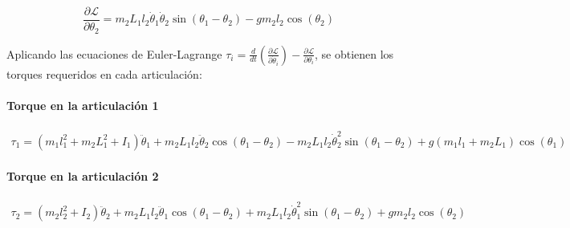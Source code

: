 \begin{equation}
\frac{\partial \mathcal{L}}{\partial \theta_2} = m_2L_1l_2\dot{\theta}_1\dot{\theta}_2\sin(\theta_1 - \theta_2) - gm_2l_2\cos(\theta_2)
\end{equation}

Aplicando las ecuaciones de Euler-Lagrange $\tau_i = \frac{d}{dt}\left(\frac{\partial \mathcal{L}}{\partial \dot{\theta}_i}\right) - \frac{\partial \mathcal{L}}{\partial \theta_i}$, se obtienen los torques requeridos en cada articulación:

\paragraph{Torque en la articulación 1}


\begin{multline}
\tau_1 = (m_1l_1^2 + m_2L_1^2 + I_1)\ddot{\theta}_1 + m_2L_1l_2\ddot{\theta}_2\cos(\theta_1 - \theta_2) - m_2L_1l_2\dot{\theta}_2^2\sin(\theta_1 - \theta_2) + g(m_1l_1 + m_2L_1)\cos(\theta_1)
\label{ec:torqueT1}
\end{multline}

\paragraph{Torque en la articulación 2}

\begin{multline}
\tau_2 = (m_2l_2^2 + I_2)\ddot{\theta}_2 + m_2L_1l_2\ddot{\theta}_1\cos(\theta_1 - \theta_2) + m_2L_1l_2\dot{\theta}_1^2\sin(\theta_1 - \theta_2) + gm_2l_2\cos(\theta_2)
\label{ec:torqueT2}
\end{multline}
